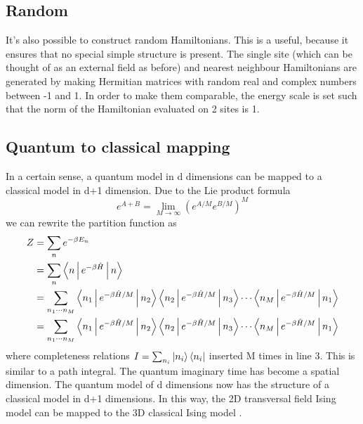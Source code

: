 \subsection{Random}\label{randhamexpl}
It's also possible to construct random Hamiltonians. This is a useful, because it ensures that no special simple structure is present. The single site (which can be thought of as an external field as before) and nearest neighbour Hamiltonians are generated by making Hermitian matrices with random real and complex numbers between -1 and 1. In order to make them comparable, the energy scale is set such that the norm of the Hamiltonian evaluated on 2 sites is 1.

\subsection{Quantum to classical mapping}\label{q2cmap}

In a certain sense, a quantum model in d dimensions can be mapped to a classical model in d+1 dimension. Due to the Lie product formula
\begin{equation}
    e^{A+B} = \lim_{M \to \infty } ( e^{A/M} e^{B/M}  )^M
\end{equation}
we can rewrite the partition function as
\begin{equation}
    \begin{split}
        Z &= \sum_n e^{ - \beta E_n} \\
        &= \sum_n \Braket{n | e^{ - \beta \hat{H} }  | n} \\
        &= \sum_{n_1 \cdots n_M} \Braket{n_1 | e^{ - \beta \hat{H} /M}  | n_2}  \Braket{n_2 | e^{ - \beta \hat{H} /M }  | n_3} \cdots  \Braket{n_{M} | e^{ - \beta \hat{H} /M }  | n_1} \\
        &= \sum_{  n_1 \cdots n_M} \Braket{n_1 | e^{ - \beta \hat{H} /M}  | n_2}  \Braket{n_2 | e^{ - \beta \hat{H} /M }  | n_3} \cdots  \Braket{n_{M} | e^{ - \beta \hat{H} /M }  | n_1} \\
    \end{split}
\end{equation}
where completeness relations $ I = \sum_{n_i}  \ket{ n_i } \bra{ n_i}  $ inserted M times in line 3. This is similar to a path integral. The quantum imaginary time has become a spatial dimension. The quantum model of d dimensions now has the structure of a classical model in d+1 dimensions. In this way, the 2D transversal field Ising model can be mapped to the 3D classical Ising model \cite{Hsieh}.